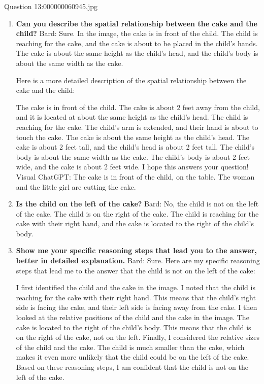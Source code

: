    Question 13:000000060945.jpg
    \begin{enumerate}
        \item \textbf{Can you describe the spatial relationship between the cake and the child?}
        \subitem 
        Bard:
        Sure. In the image, the cake is in front of the child. The child is reaching for the cake, and the cake is about to be placed in the child's hands. The cake is about the same height as the child's head, and the child's body is about the same width as the cake.

        Here is a more detailed description of the spatial relationship between the cake and the child:

        The cake is in front of the child. The cake is about 2 feet away from the child, and it is located at about the same height as the child's head.
        The child is reaching for the cake. The child's arm is extended, and their hand is about to touch the cake.
        The cake is about the same height as the child's head. The cake is about 2 feet tall, and the child's head is about 2 feet tall.
        The child's body is about the same width as the cake. The child's body is about 2 feet wide, and the cake is about 2 feet wide.
        I hope this answers your question!
        \subitem Visual ChatGPT: The cake is in front of the child, on the table. The woman and the little girl are cutting the cake.
        \item \textbf{Is the child on the left of the cake?}
        \subitem Bard: No, the child is not on the left of the cake. The child is on the right of the cake. The child is reaching for the cake with their right hand, and the cake is located to the right of the child's body.
        \item \textbf{Show me your specific reasoning steps that lead you to the answer, better in detailed explanation.}
        \subitem Bard:
        Sure. Here are my specific reasoning steps that lead me to the answer that the child is not on the left of the cake:

        I first identified the child and the cake in the image.
        I noted that the child is reaching for the cake with their right hand. This means that the child's right side is facing the cake, and their left side is facing away from the cake.
        I then looked at the relative positions of the child and the cake in the image. The cake is located to the right of the child's body. This means that the child is on the right of the cake, not on the left.
        Finally, I considered the relative sizes of the child and the cake. The child is much smaller than the cake, which makes it even more unlikely that the child could be on the left of the cake.
        Based on these reasoning steps, I am confident that the child is not on the left of the cake.


\end{enumerate}
